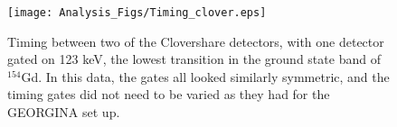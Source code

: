 \begin{figure}
    \centering
    \texttt{[image: Analysis\_Figs/Timing\_clover.eps]}
    \caption[Timing example for the Clovershare setup]{Timing between two of the Clovershare detectors, with one detector gated on 123 keV, the lowest transition in the ground state band of $^{154}$Gd. In this data, the gates all looked similarly symmetric, and the timing gates did not need to be varied as they had for the GEORGINA set up.}
    \label{fig:timing_clover}
\end{figure}